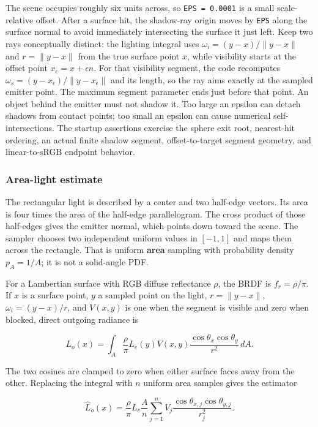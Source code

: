 The scene occupies roughly six units across, so \texttt{EPS\ =\ 0.0001} is a small scale-relative offset. After a surface hit, the shadow-ray origin moves by \texttt{EPS} along the surface normal to avoid immediately intersecting the surface it just left. Keep two rays conceptually distinct: the lighting integral uses \(\omega_i=(y-x)/\|y-x\|\) and \(r=\|y-x\|\) from the true surface point \(x\), while visibility starts at the offset point \(x_\epsilon=x+\epsilon n\). For that visibility segment, the code recomputes \(\omega_s=(y-x_\epsilon)/\|y-x_\epsilon\|\) and its length, so the ray aims exactly at the sampled emitter point. The maximum segment parameter ends just before that point. An object behind the emitter must not shadow it. Too large an epsilon can detach shadows from contact points; too small an epsilon can cause numerical self-intersections. The startup assertions exercise the sphere exit root, nearest-hit ordering, an actual finite shadow segment, offset-to-target segment geometry, and linear-to-sRGB endpoint behavior.

\subsubsection{Area-light estimate}\label{04-visual-computing-ii-ch035-area-light-estimate}

The rectangular light is described by a center and two half-edge vectors. Its area is four times the area of the half-edge parallelogram. The cross product of those half-edges gives the emitter normal, which points down toward the scene. The sampler chooses two independent uniform values in \([-1,1]\) and maps them across the rectangle. That is uniform \textbf{area} sampling with probability density \(p_A=1/A\); it is not a solid-angle PDF.

For a Lambertian surface with RGB diffuse reflectance \(\rho\), the BRDF is \(f_r=\rho/\pi\). If \(x\) is a surface point, \(y\) a sampled point on the light, \(r=\|y-x\|\), \(\omega_i=(y-x)/r\), and \(V(x,y)\) is one when the segment is visible and zero when blocked, direct outgoing radiance is

\[
L_o(x)=\int_A \frac{\rho}{\pi} L_e(y) V(x,y)
\frac{\cos\theta_x\cos\theta_y}{r^2}\,dA.
\]

The two cosines are clamped to zero when either surface faces away from the other. Replacing the integral with \(n\) uniform area samples gives the estimator

\[
\widehat L_o(x)=\frac{\rho}{\pi}L_e\frac{A}{n}
\sum_{j=1}^{n} V_j\frac{\cos\theta_{x,j}\cos\theta_{y,j}}{r_j^2}.
\]

